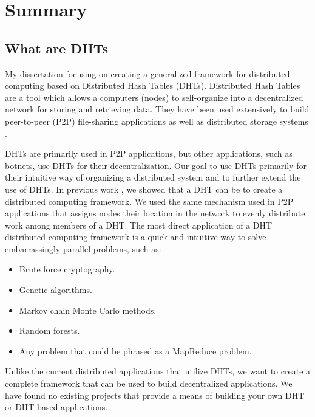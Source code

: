 \documentclass[12pt,a4paper]{article}
\begin{document}
\newpage





\section{Summary}
\subsection*{What are DHTs}
My dissertation focusing on creating a generalized framework for distributed computing based on Distributed Hash Tables (DHTs).
Distributed Hash Tables are a tool which allows a computers (nodes) to self-organize into a decentralized network for storing and retrieving data.
They have been used extensively to build peer-to-peer (P2P) file-sharing applications \cite{bittorrent} as well as distributed storage systems \cite{CFS}.

DHTs are primarily used in P2P applications, but other applications, such as botnets, use DHTs for their decentralization.
Our goal to use DHTs primarily for their intuitive way of organizing a distributed system and to further extend the use of DHTs.
In previous work \cite{chordreduce}, we showed  that a DHT can be to create a distributed computing framework.
We used the same mechanism used in P2P applications that assigns nodes their location in the network to evenly distribute work among members of a DHT.
The most direct application of a DHT distributed computing framework is a quick and intuitive way to solve embarrassingly parallel problems, such as:
\begin{itemize}
	\item Brute force cryptography.
	\item Genetic algorithms.
	\item Markov chain Monte Carlo methods.
	\item Random forests.
	\item Any problem that could be phrased as a MapReduce \cite{mapreduce} problem.
\end{itemize}
Unlike the current distributed applications that utilize DHTs, we want to create a complete framework that can be used to build decentralized applications.
We have found no existing projects that provide a means of building your own DHT or DHT based applications. %
\end{document}
